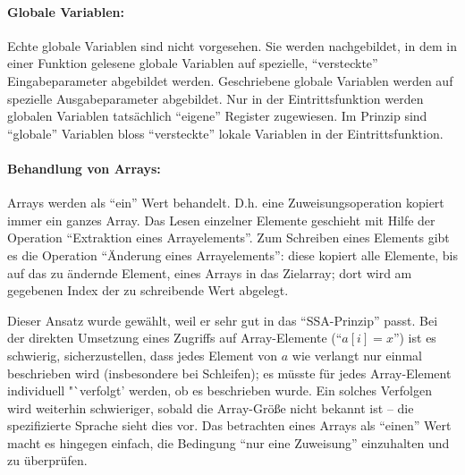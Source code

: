 \documentclass[twoside,a4paper,fleqn,12pt]{article}
\begin{document}
\paragraph{Globale Variablen:}
Echte globale Variablen sind nicht vorgesehen. Sie werden nachgebildet, in dem in einer Funktion gelesene globale Variablen
auf spezielle, "`versteckte"' Eingabeparameter abgebildet werden. Geschriebene globale Variablen werden
auf spezielle Ausgabeparameter abgebildet. Nur in der Eintrittsfunktion werden globalen Variablen tatsächlich
"`eigene"' Register zugewiesen. Im Prinzip sind "`globale"' Variablen bloss "`versteckte"' lokale Variablen in
der Eintrittsfunktion.



\paragraph{Behandlung von Arrays:}
Arrays werden als "`ein"' Wert behandelt. D.h. eine Zuweisungsoperation kopiert immer ein ganzes Array.
Das Lesen einzelner Elemente geschieht mit Hilfe der Operation "`Extraktion eines Arrayelements"'.
Zum Schreiben eines Elements gibt es die Operation "`Änderung eines Arrayelements"':
diese kopiert alle Elemente, bis auf das zu ändernde Element, eines Arrays in das Zielarray;
dort wird am gegebenen Index der zu schreibende Wert abgelegt.

Dieser Ansatz wurde gewählt, weil er sehr gut in das "`SSA-Prinzip"' passt.
Bei der direkten Umsetzung eines Zugriffs auf Array-Elemente ("`$a[i] = x$"') ist es schwierig, sicherzustellen, dass
jedes Element von $a$ wie verlangt nur einmal beschrieben wird (insbesondere bei Schleifen); es
müsste für jedes Array-Element individuell "`verfolgt' werden, ob es beschrieben wurde.
Ein solches Verfolgen wird weiterhin schwieriger, sobald die Array-Größe nicht bekannt ist
-- die spezifizierte Sprache sieht dies vor. Das betrachten eines Arrays als "`einen"' Wert macht es hingegen einfach,
die Bedingung "`nur eine Zuweisung"' einzuhalten und zu überprüfen.
\end{document}
